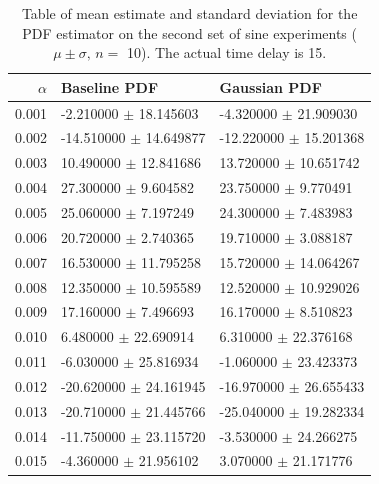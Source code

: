 \documentclass[a4paper,11pt]{article}
\begin{document}
\begin{appendices}
\begin{table}[htb]
\caption{Table of mean estimate and standard deviation for the PDF estimator on the second set of sine experiments ($\mu\pm\sigma,\,n=$ 10). The actual time delay is 15.} 
\begin{center}
\begin{tabular}{r|ll}
 $\alpha$  &  Baseline PDF                &  Gaussian PDF                \\
\hline
    0.001  &  -2.210000 $\pm$ 18.145603   &  -4.320000 $\pm$ 21.909030   \\
    0.002  &  -14.510000 $\pm$ 14.649877  &  -12.220000 $\pm$ 15.201368  \\
    0.003  &  10.490000 $\pm$ 12.841686   &  13.720000 $\pm$ 10.651742   \\
    0.004  &  27.300000 $\pm$ 9.604582    &  23.750000 $\pm$ 9.770491    \\
    0.005  &  25.060000 $\pm$ 7.197249    &  24.300000 $\pm$ 7.483983    \\
    0.006  &  20.720000 $\pm$ 2.740365    &  19.710000 $\pm$ 3.088187    \\
    0.007  &  16.530000 $\pm$ 11.795258   &  15.720000 $\pm$ 14.064267   \\
    0.008  &  12.350000 $\pm$ 10.595589   &  12.520000 $\pm$ 10.929026   \\
    0.009  &  17.160000 $\pm$ 7.496693    &  16.170000 $\pm$ 8.510823    \\
    0.010  &  6.480000 $\pm$ 22.690914    &  6.310000 $\pm$ 22.376168    \\
    0.011  &  -6.030000 $\pm$ 25.816934   &  -1.060000 $\pm$ 23.423373   \\
    0.012  &  -20.620000 $\pm$ 24.161945  &  -16.970000 $\pm$ 26.655433  \\
    0.013  &  -20.710000 $\pm$ 21.445766  &  -25.040000 $\pm$ 19.282334  \\
    0.014  &  -11.750000 $\pm$ 23.115720  &  -3.530000 $\pm$ 24.266275   \\
    0.015  &  -4.360000 $\pm$ 21.956102   &  3.070000 $\pm$ 21.171776    \\
\end{tabular}
\end{center}
\end{table}



\end{appendices}
\end{document}
